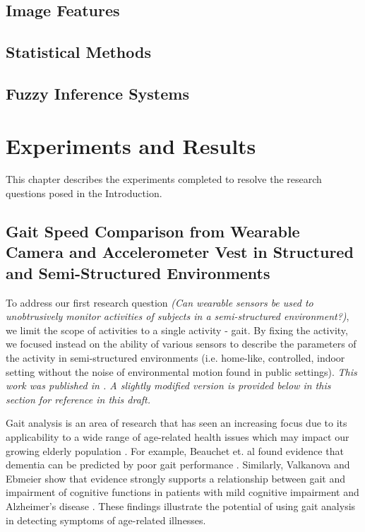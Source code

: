 \documentclass[12pt]{report}
\begin{document}
\section{Image Features}

\section{Statistical Methods}

\section{Fuzzy Inference Systems}

\chapter{Experiments and Results}

This chapter describes the experiments completed to resolve the research questions posed in the Introduction.

\section{Gait Speed Comparison from Wearable Camera and Accelerometer Vest in Structured and Semi-Structured Environments}
To address our first research question \emph{(Can wearable sensors be used to unobtrusively monitor activities of subjects in a semi-structured environment?)}, we limit the scope of activities to a single activity - gait. By fixing the activity, we focused instead on the ability of various sensors to describe the parameters of the activity in semi-structured environments (i.e. home-like, controlled, indoor setting without the noise of environmental motion found in public settings). \emph{This work was published in \cite{Schneider2019ComparisonEnvironments}. A slightly modified version is provided below in this section for reference in this draft.}

Gait analysis is an area of research that has seen an increasing focus due to its applicability to a wide range of age-related health issues which may impact our growing elderly population \cite{Ortman2014AnStates}. For example, Beauchet et. al found evidence that dementia can be predicted by poor gait performance \cite{Beauchet2016PoorMeta-Analysis}. Similarly, Valkanova and Ebmeier show that evidence strongly supports a relationship between gait and impairment of cognitive functions in patients with mild cognitive impairment and Alzheimer's disease \cite{Valkanova2017WhatEvidence}. These findings illustrate the potential of using gait analysis in detecting symptoms of age-related illnesses.
\end{document}
